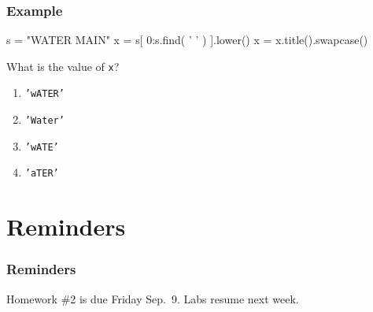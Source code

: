 \documentclass[11pt]{beamer}
\begin{document}
\begin{frame}[fragile]
  \frametitle{Example}
  \Enlarge

  \begin{semiverbatim}
s = "WATER MAIN"
x = s[ 0:s.find( ' ' ) ].lower()
x = x.title().swapcase()
  \end{semiverbatim}
  What is the value of \texttt{x}?
  \begin{enumerate}[label=\Alph*]
  \item  \texttt{'wATER'}
  \item  \texttt{'Water'}
  \item  \texttt{'wATE'}
  \item  \texttt{'aTER'}
  \end{enumerate}
\end{frame}

\section{Reminders}

\begin{frame}
  \frametitle{Reminders}
  \Enlarge

  \begin{itemize}
  \myitem  Homework \#2 is due Friday Sep.\ 9.
  \myitem  Labs resume next week.
  \end{itemize}
\end{frame}
\end{document}
